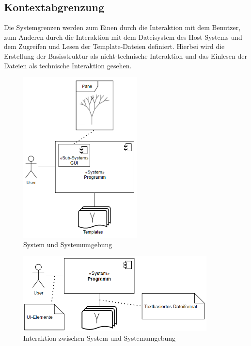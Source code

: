 \subsection*{Kontextabgrenzung}
Die Systemgrenzen werden zum Einen durch die Interaktion mit dem Benutzer, zum Anderen durch die Interaktion mit
dem Dateisystem des Host-Systems und dem Zugreifen und Lesen der Template-Dateien definiert.
Hierbei wird die Erstellung der Basisstruktur als nicht-technische Interaktion und das Einlesen der Dateien als
technische Interaktion gesehen.
\begin{figure}[H]
    \centering
    \includegraphics[width=6.2cm]{../images/Fachlicher_Kontext.PNG}
    \caption{System und Systemumgebung}
\end{figure}
\begin{figure}[H]
    \centering
    \includegraphics[width=10cm]{../images/Technischer_Kontext.PNG}
    \caption{Interaktion zwischen System und Systemumgebung}
\end{figure}

\newpage

